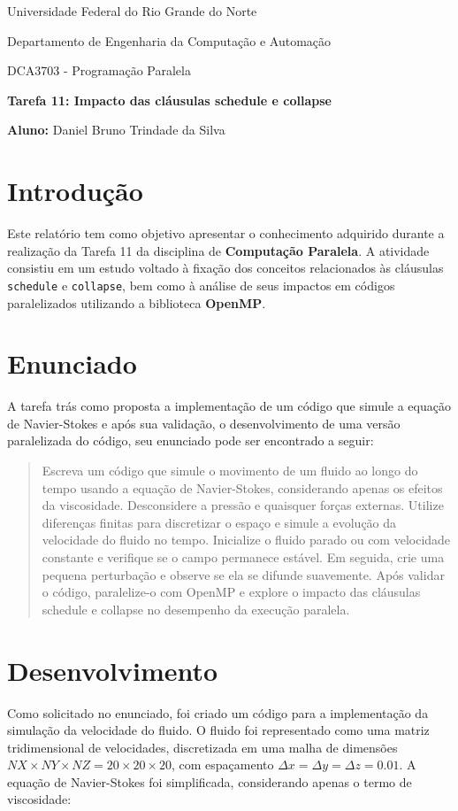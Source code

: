 \documentclass[a4paper, 12pt]{article}
\begin{document}
	\begin{center}
		Universidade Federal do Rio Grande do Norte
		
		Departamento de Engenharia da Computação e Automação  
		
		DCA3703 - Programação Paralela  
		
		\textbf{Tarefa 11: Impacto das cláusulas schedule e collapse}  
		
		\textbf{Aluno:} Daniel Bruno Trindade da Silva  
	\end{center}  
	
	\section{Introdução}  
	\hspace{.62cm}Este relatório tem como objetivo apresentar o conhecimento adquirido durante a realização da Tarefa 11 da disciplina de \textbf{Computação Paralela}. A atividade consistiu em um estudo voltado à fixação dos conceitos relacionados às cláusulas \texttt{schedule} e \texttt{collapse}, bem como à análise de seus impactos em códigos paralelizados utilizando a biblioteca \textbf{OpenMP}.  
	
	\section{Enunciado}  
	\hspace{.62cm}A tarefa trás como proposta a implementação de um código que simule a equação de Navier-Stokes e após sua validação, o desenvolvimento de uma versão paralelizada do código, seu enunciado pode ser encontrado a seguir:  
	
	\begin{quote}  
		Escreva um código que simule o movimento de um fluido ao longo do tempo usando a equação de Navier-Stokes, considerando apenas os efeitos da viscosidade. Desconsidere a pressão e quaisquer forças externas. Utilize diferenças finitas para discretizar o espaço e simule a evolução da velocidade do fluido no tempo. Inicialize o fluido parado ou com velocidade constante e verifique se o campo permanece estável. Em seguida, crie uma pequena perturbação e observe se ela se difunde suavemente. Após validar o código, paralelize-o com OpenMP e explore o impacto das cláusulas schedule e collapse no desempenho da execução paralela.  
	\end{quote}  
	
	\section{Desenvolvimento}  
	\hspace{.62cm}Como solicitado no enunciado, foi criado um código para a implementação da simulação da velocidade do fluido. O fluido foi representado como uma matriz tridimensional de velocidades, discretizada em uma malha de dimensões \( NX \times NY \times NZ = 20 \times 20 \times 20 \), com espaçamento \( \Delta x = \Delta y = \Delta z = 0.01 \). A equação de Navier-Stokes foi simplificada, considerando apenas o termo de viscosidade:  
	
\end{document}
